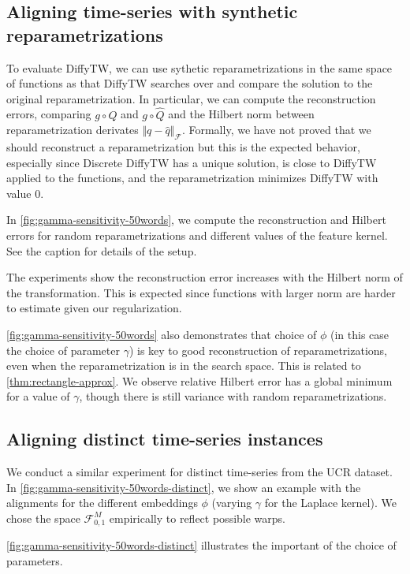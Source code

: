\subsection{Aligning time-series with synthetic reparametrizations}
To evaluate DiffyTW, we can use sythetic reparametrizations in the same space of functions as that DiffyTW searches over and compare the solution to the original reparametrization. In particular, we can compute the reconstruction errors, comparing $g\circ Q$ and $g \circ \hat Q$ and the Hilbert norm between reparametrization derivates $\Vert q - \hat q\Vert_\mathcal F$. Formally, we have not proved that we should reconstruct a reparametrization but this is the expected behavior, especially since Discrete DiffyTW has a unique solution, is close to DiffyTW applied to the functions, and the reparametrization minimizes DiffyTW with value $0$.

In \cref{fig:gamma-sensitivity-50words}, we compute the reconstruction and Hilbert errors for random reparametrizations and different values of the feature kernel. See the caption for details of the setup.

The experiments show the reconstruction error increases with the Hilbert norm of the transformation. This is expected since functions with larger norm are harder to estimate given our regularization.

\cref{fig:gamma-sensitivity-50words} also demonstrates that choice of $\phi$ (in this case the choice of parameter $\gamma$) is key to good reconstruction of reparametrizations, even when the reparametrization is in the search space. This is related to \cref{thm:rectangle-approx}. We observe relative Hilbert error has a global minimum for a value of $\gamma$, though there is still variance with random reparametrizations.

\subsection{Aligning distinct time-series instances}
We conduct a similar experiment for distinct time-series from the UCR dataset. In \cref{fig:gamma-sensitivity-50words-distinct}, we show an example with the alignments for the different embeddings $\phi$ (varying $\gamma$ for the Laplace kernel). We chose the space $\mathcal F_{0,1}^M$ empirically to reflect possible warps.

\cref{fig:gamma-sensitivity-50words-distinct} illustrates the important of the choice of parameters.





